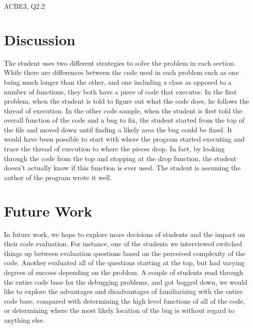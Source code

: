 \documentclass{article}
\begin{document}
ACBE3, Q2.2 

\section{Discussion}
The student uses two different strategies to solve the problem in each section. While there are differences between the code used in each problem such as one being much longer than the other, and one including a class as opposed to a number of functions, they both have a piece of code that executes. In the first problem, when the student is told to figure out what the code does, he follows the thread of execution. In the other code sample, when the student is first told the overall function of the code and a bug to fix, the student started from the top of the file and moved down until finding a likely area the bug could be fixed. It would have been possible to start with where the program started executing and trace the thread of execution to where the pieces drop. In fact, by looking through the code from the top and stopping at the drop function, the student doesn't actually know if this function is ever used. The student is assuming the author of the program wrote it well. 

\section{Future Work}
In future work, we hope to explore more decisions of students and the impact on their code evaluation.
For instance, one of the students we interviewed switched things up between evaluation questions based on the perceived complexity of the code.
Another evaluated all of the questions starting at the top, but had varying degrees of success depending on the problem.
A couple of students read through the entire code base for the debugging problems, and got bogged down, we would like to explore the advantages and disadvantages of familiarizing with the entire code base, compared with determining the high level functions of all of the code, or determining where the most likely location of the bug is without regard to anything else.
\end{document}
